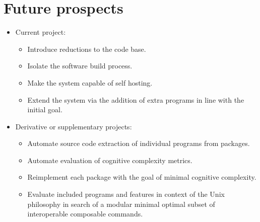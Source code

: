 \section{Future prospects}\label{Future prospects}

\begin{itemize}
    \item Current project:
    \begin{itemize}
        \item Introduce reductions to the code base.
        \item Isolate the software build process.
        \item Make the system capable of self hosting.
        \item Extend the system via the addition of extra programs in line with the initial goal.
    \end{itemize}
    \item Derivative or supplementary projects:
    \begin{itemize}
        \item Automate source code extraction of individual programs from packages.
        \item Automate evaluation of cognitive complexity metrics.
        \item Reimplement each package with the goal of minimal cognitive complexity.
        \item Evaluate included programs and features in context of the Unix philosophy in search of a modular minimal optimal subset of interoperable composable commands.
    \end{itemize}
\end{itemize}
